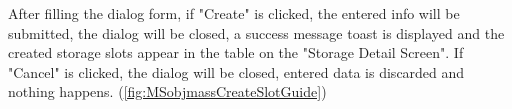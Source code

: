 After filling the dialog form, if "Create" is clicked, the entered info will be submitted, the dialog will be closed, a success message toast is displayed and the created storage slots appear in the table on the "Storage Detail Screen". If "Cancel" is clicked, the dialog will be closed, entered data is discarded and nothing happens.
(\autoref{fig:MSobjmassCreateSlotGuide})

\begin{figure}[H] %
	\centering

    \vspace{10pt}
    \hspace{5pt}


\end{figure}

